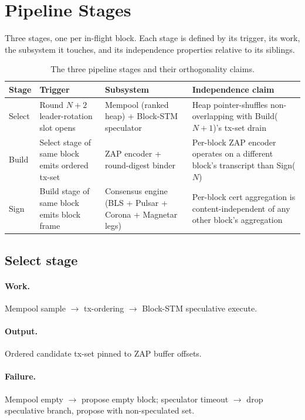 \section{Pipeline Stages}

Three stages, one per in-flight block. Each stage is defined by its
trigger, its work, the subsystem it touches, and its independence
properties relative to its siblings.

\begin{table}[h]
\centering
\small
\begin{tabular}{@{}lp{3.2cm}p{3.2cm}p{4cm}@{}}
\toprule
\textbf{Stage} & \textbf{Trigger} & \textbf{Subsystem} & \textbf{Independence claim} \\
\midrule
Select & Round $N{+}2$ leader-rotation slot opens & Mempool (ranked heap) + Block-STM speculator & Heap pointer-shuffles non-overlapping with Build($N{+}1$)'s tx-set drain \\
Build & Select stage of same block emits ordered tx-set & ZAP encoder + round-digest binder & Per-block ZAP encoder operates on a different block's transcript than Sign($N$) \\
Sign & Build stage of same block emits block frame & Consensus engine (BLS + Pulsar + Corona + Magnetar legs) & Per-block cert aggregation is content-independent of any other block's aggregation \\
\bottomrule
\end{tabular}
\caption{The three pipeline stages and their orthogonality claims.}
\label{tab:stages}
\end{table}

\subsection{Select stage}

\paragraph{Work.} Mempool sample $\to$ tx-ordering $\to$ Block-STM
speculative execute.

\paragraph{Output.} Ordered candidate tx-set pinned to ZAP buffer
offsets.

\paragraph{Failure.} Mempool empty $\to$ propose empty block;
speculator timeout $\to$ drop speculative branch, propose with
non-speculated set.

